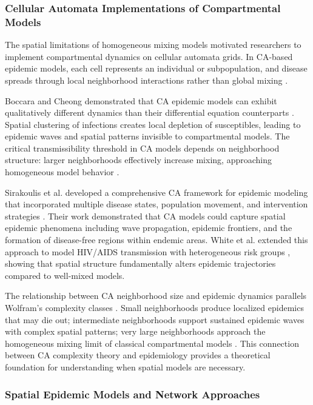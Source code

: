 \subsubsection{Cellular Automata Implementations of Compartmental Models}

The spatial limitations of homogeneous mixing models motivated researchers to implement compartmental dynamics on cellular automata grids. In CA-based epidemic models, each cell represents an individual or subpopulation, and disease spreads through local neighborhood interactions rather than global mixing \cite{fuentes2004epidemic}.

Boccara and Cheong demonstrated that CA epidemic models can exhibit qualitatively different dynamics than their differential equation counterparts \cite{boccara1997critical}. Spatial clustering of infections creates local depletion of susceptibles, leading to epidemic waves and spatial patterns invisible to compartmental models. The critical transmissibility threshold in CA models depends on neighborhood structure: larger neighborhoods effectively increase mixing, approaching homogeneous model behavior \cite{fuks2001cellular}.

Sirakoulis et al. developed a comprehensive CA framework for epidemic modeling that incorporated multiple disease states, population movement, and intervention strategies \cite{sirakoulis2000cellular}. Their work demonstrated that CA models could capture spatial epidemic phenomena including wave propagation, epidemic frontiers, and the formation of disease-free regions within endemic areas. White et al. extended this approach to model HIV/AIDS transmission with heterogeneous risk groups \cite{white2007modelling}, showing that spatial structure fundamentally alters epidemic trajectories compared to well-mixed models.

The relationship between CA neighborhood size and epidemic dynamics parallels Wolfram's complexity classes \cite{wolfram1984universality}. Small neighborhoods produce localized epidemics that may die out; intermediate neighborhoods support sustained epidemic waves with complex spatial patterns; very large neighborhoods approach the homogeneous mixing limit of classical compartmental models \cite{fuks2001cellular}. This connection between CA complexity theory and epidemiology provides a theoretical foundation for understanding when spatial models are necessary.

\subsubsection{Spatial Epidemic Models and Network Approaches}

